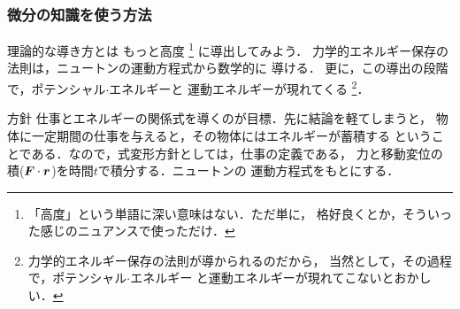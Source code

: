             \subsubsection{微分の知識を使う方法}
            \begin{mysmallsec}{理論的な導き方とは}
                もっと高度
                    \footnote{
                        「高度」という単語に深い意味はない．ただ単に，
                        格好良くとか，そういった感じのニュアンスで使っただけ．
                    }
                に導出してみよう．
                力学的エネルギー保存の法則は，ニュートンの運動方程式から数学的に
                導ける．
                更に，この導出の段階で，ポテンシャル$\cdot$エネルギーと
                運動エネルギーが現れてくる
                    \footnote{
                        力学的エネルギー保存の法則が導かられるのだから，
                        当然として，その過程で，ポテンシャル$\cdot$エネルギー
                        と運動エネルギーが現れてこないとおかしい．
                    }．
            \end{mysmallsec}

            \begin{mysmallsec}{方針}
                仕事とエネルギーの関係式を導くのが目標．先に結論を軽てしまうと，
                物体に一定期間の仕事を与えると，その物体にはエネルギーが蓄積する
                ということである．なので，式変形方針としては，仕事の定義である，
                力と移動変位の積($\boldsymbol{F}\cdot\boldsymbol{r}$)を時間$t$で積分する．ニュートンの
                運動方程式をもとにする．
            \end{mysmallsec}

